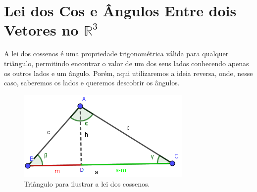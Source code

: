 \documentclass[a4paper,12pt]{article}
\begin{document}
\section{Lei dos Cos e Ângulos Entre dois Vetores no $\mathbb{R}^3$}
\label{ap:cos}
A lei dos cossenos é uma propriedade trigonométrica válida para qualquer triângulo, permitindo encontrar o valor de um dos seus lados conhecendo apenas os outros lados e um ângulo. Porém, aqui utilizaremos a ideia reversa, onde, nesse caso, saberemos os lados e queremos descobrir os ângulos.
\begin{figure}[H]
	\begin{center}
		\includegraphics[width=0.50\linewidth]{figures/triangulo.png}
	\end{center}
	\caption{Triângulo para ilustrar a lei dos cossenos.}
	\label{fig:coslaw}
\end{figure}
\end{document}
